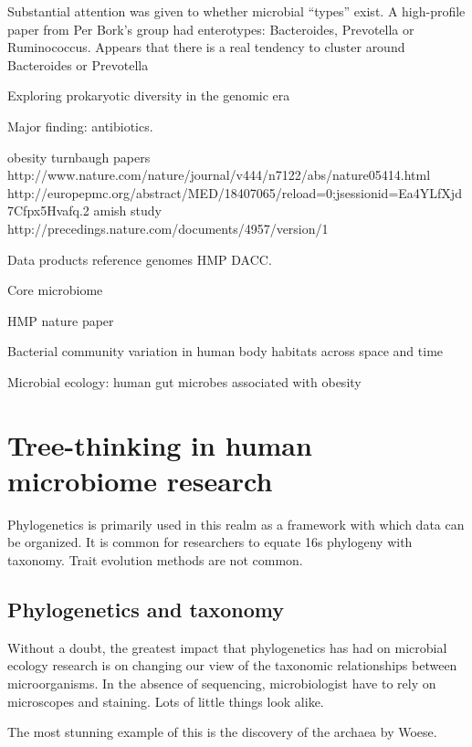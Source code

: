\documentclass{amsart}
\begin{document}
Substantial attention was given to whether microbial ``types'' exist.
A high-profile paper from Per Bork's group had enterotypes: Bacteroides, Prevotella or Ruminococcus.
\cite{arumugam2011enterotypes}
Appears that there is a real tendency to cluster around Bacteroides or Prevotella \cite{wu2011linking}

\cite{hugenholtz2002review}
{Exploring prokaryotic diversity in the genomic era}


Major finding: antibiotics.
\cite{dethlefsen2008pervasive,dethlefsen2011incomplete,jakobsson2010short,jernberg2007long}

obesity
turnbaugh papers
http://www.nature.com/nature/journal/v444/n7122/abs/nature05414.html
http://europepmc.org/abstract/MED/18407065/reload=0;jsessionid=Ea4YLfXjd7Cfpx5Hvafq.2
amish study
http://precedings.nature.com/documents/4957/version/1

Data products
reference genomes
HMP DACC.

Core microbiome
\cite{turnbaugh2008core}

HMP nature paper
\cite{methe2012framework}

\cite{costello2009bacterial}
Bacterial community variation in human body habitats across space and time

\cite{ley2006microbial}
Microbial ecology: human gut microbes associated with obesity



\section{Tree-thinking in human microbiome research}

Phylogenetics is primarily used in this realm as a framework with which data can be organized.
It is common for researchers to equate 16s phylogeny with taxonomy.
Trait evolution methods are not common.

\subsection{Phylogenetics and taxonomy}

Without a doubt, the greatest impact that phylogenetics has had on microbial ecology research is on changing our view of the taxonomic relationships between microorganisms.
In the absence of sequencing, microbiologist have to rely on microscopes and staining.
Lots of little things look alike.

The most stunning example of this is the discovery of the archaea by Woese.
\end{document}
